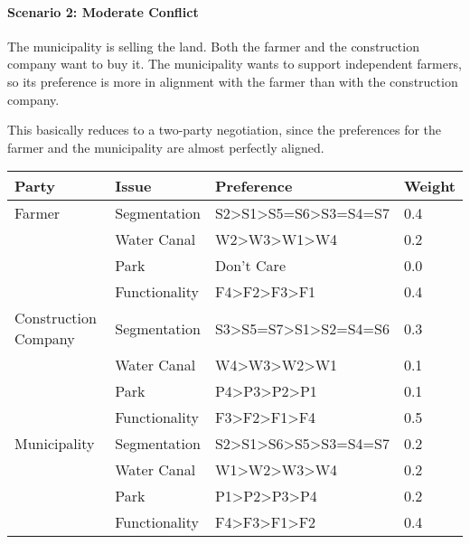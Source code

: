 \documentclass[a4,11pt]{scrartcl}
\begin{document}
    \paragraph{Scenario 2: Moderate Conflict}
    
    The municipality is selling the land. Both the farmer and the 
    construction company want to buy it. The municipality wants to
    support independent farmers, so its preference is more in alignment
    with the farmer than with the construction company.
    
    This basically reduces to a two-party negotiation, since the 
    preferences for the farmer and the municipality are almost 
    perfectly aligned.
    
    \begin{center}
    \begin{tabular}{|l|l|l|l|}
        \hline{}
        {\bf Party}&{\bf Issue}&{\bf Preference}&{\bf Weight}\\
        \hline\hline
        Farmer & Segmentation & S2\textgreater S1\textgreater S5=S6\textgreater S3=S4=S7 & 0.4\\
        \cline{2-4}&Water Canal & W2\textgreater W3\textgreater W1\textgreater W4&0.2\\
        \cline{2-4}&Park& Don't Care & 0.0\\
        \cline{2-4}&Functionality&F4\textgreater F2\textgreater F3\textgreater F1& 0.4\\
        \hline\hline{}
        Construction Company & Segmentation & S3\textgreater S5=S7\textgreater S1\textgreater S2=S4=S6 & 0.3\\
        \cline{2-4}&Water Canal & W4\textgreater W3\textgreater W2\textgreater W1&0.1\\
        \cline{2-4}&Park& P4\textgreater P3\textgreater P2\textgreater P1 & 0.1\\
        \cline{2-4}&Functionality&F3\textgreater F2\textgreater F1\textgreater F4& 0.5\\
        \hline\hline{}
        Municipality & Segmentation & S2\textgreater S1\textgreater S6\textgreater S5\textgreater S3=S4=S7 & 0.2\\
        \cline{2-4}&Water Canal & W1\textgreater W2\textgreater W3\textgreater W4&0.2\\
        \cline{2-4}&Park& P1\textgreater P2\textgreater P3\textgreater P4 & 0.2\\
        \cline{2-4}&Functionality&F4\textgreater F3\textgreater F1\textgreater F2& 0.4\\
        \hline
    \end{tabular}
    \end{center}
    
\end{document}
